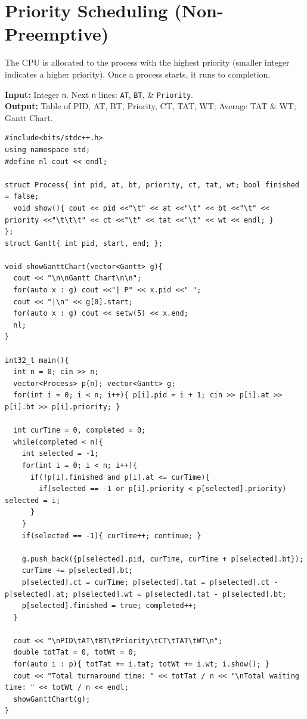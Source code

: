 \documentclass[10pt, a4paper]{article}
\begin{document}
\section{Priority Scheduling (Non-Preemptive)}
The CPU is allocated to the process with the highest priority (smaller integer indicates a higher priority). Once a process starts, it runs to completion.

\begin{tcolorbox}[title=Input \& Output Format, iobox]
\textbf{Input:} Integer \texttt{n}. Next \texttt{n} lines: \texttt{AT}, \texttt{BT}, \& \texttt{Priority}.\\
\textbf{Output:} Table of PID, AT, BT, Priority, CT, TAT, WT; Average TAT \& WT; Gantt Chart.
\end{tcolorbox}

\begin{lstlisting}
#include<bits/stdc++.h>
using namespace std;
#define nl cout << endl;

struct Process{ int pid, at, bt, priority, ct, tat, wt; bool finished = false;
  void show(){ cout << pid <<"\t" << at <<"\t" << bt <<"\t" << priority <<"\t\t\t" << ct <<"\t" << tat <<"\t" << wt << endl; }
};
struct Gantt{ int pid, start, end; };

void showGanttChart(vector<Gantt> g){
  cout << "\n\nGantt Chart\n\n";
  for(auto x : g) cout <<"| P" << x.pid <<" ";
  cout << "|\n" << g[0].start;
  for(auto x : g) cout << setw(5) << x.end;
  nl;
}

int32_t main(){
  int n = 0; cin >> n;
  vector<Process> p(n); vector<Gantt> g;
  for(int i = 0; i < n; i++){ p[i].pid = i + 1; cin >> p[i].at >> p[i].bt >> p[i].priority; }

  int curTime = 0, completed = 0;
  while(completed < n){
    int selected = -1;
    for(int i = 0; i < n; i++){
      if(!p[i].finished and p[i].at <= curTime){
        if(selected == -1 or p[i].priority < p[selected].priority) selected = i;
      }
    }
    if(selected == -1){ curTime++; continue; }
    
    g.push_back({p[selected].pid, curTime, curTime + p[selected].bt});
    curTime += p[selected].bt;
    p[selected].ct = curTime; p[selected].tat = p[selected].ct - p[selected].at; p[selected].wt = p[selected].tat - p[selected].bt;
    p[selected].finished = true; completed++;
  }
  
  cout << "\nPID\tAT\tBT\tPriority\tCT\tTAT\tWT\n";
  double totTat = 0, totWt = 0;
  for(auto i : p){ totTat += i.tat; totWt += i.wt; i.show(); }
  cout << "Total turnaround time: " << totTat / n << "\nTotal waiting time: " << totWt / n << endl;
  showGanttChart(g);
}
\end{lstlisting}
\newpage
\end{document}
